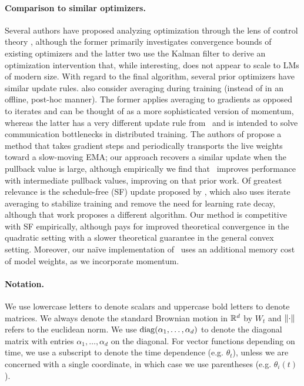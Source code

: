 \paragraph{Comparison to similar optimizers.} Several authors have proposed analyzing optimization through the lens of control theory \citep{lessard2016analysis,davtyan2022koala,xia2025koala}, although the former primarily investigates convergence bounds of existing optimizers and the latter two use the Kalman filter to derive an optimization intervention that, while interesting, does not appear to scale to LMs of modern size.  With regard to the final algorithm, several prior optimizers have similar update rules.  \citet{zhang2015deep,pagliardini2024ademamix} also consider averaging during training (instead of in an offline, post-hoc manner).  The former applies averaging to gradients as opposed to iterates and can be thought of as a more sophisticated version of momentum, whereas the latter has a very different update rule from \pace\ and is intended to solve communication bottlenecks in distributed training.
The authors of \citet{zhang2019lookahead} propose a method that takes gradient steps and periodically transports the live weights toward a slow-moving EMA; our approach recovers a similar update when the pullback value is large, although empirically we find that \pace\ improves performance with intermediate pullback values, improving on that prior work.  Of greatest relevance is the schedule-free (SF) update proposed by \citet{defazio2024schedule}, which also uses iterate averaging to stabilize training and remove the need for learning rate decay, although that work proposes a different algorithm.  Our method is competitive with SF empirically, although pays for improved theoretical convergence in the quadratic setting with a slower theoretical guarantee in the general convex setting. Moreover, our na{\"i}ve implementation of \pace\ uses an additional memory cost of model weights, as we incorporate momentum.






\paragraph{Notation.} We use lowercase letters to denote scalars and uppercase bold letters to denote matrices.  We always denote the standard Brownian motion in $\mathbb{R}^d$ by $W_t$ and $\left\|\cdot\right\|$ refers to the euclidean norm.  We use $\operatorname{diag}(\alpha_1, \dots, \alpha_d)$ to denote the diagonal matrix with entries $\alpha_1, \dots, \alpha_d$ on the diagonal.  For vector functions depending on time, we use a subscript to denote the time dependence (e.g. $\theta_t$), unless we are concerned with a single coordinate, in which case we use parentheses (e.g. $\theta_i(t)$).
